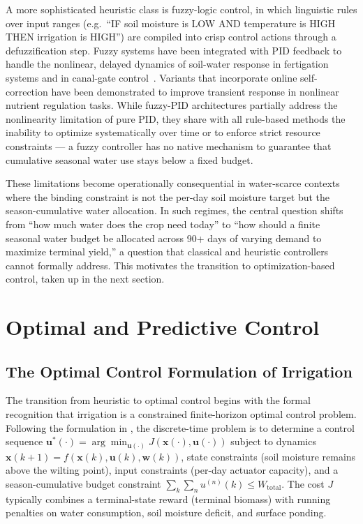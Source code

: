 A more sophisticated heuristic class is fuzzy-logic control, in which
linguistic rules over input ranges (e.g.\ ``IF soil moisture is LOW
AND temperature is HIGH THEN irrigation is HIGH'') are compiled into
crisp control actions through a defuzzification step. Fuzzy systems
have been integrated with PID feedback to handle the nonlinear,
delayed dynamics of soil-water response in fertigation systems and in
canal-gate control~\cite{Sharma2025,Mahmud2026}. Variants that
incorporate online self-correction have been demonstrated to improve
transient response in nonlinear nutrient regulation tasks. While
fuzzy-PID architectures partially address the nonlinearity limitation
of pure PID, they share with all rule-based methods the inability to
optimize systematically over time or to enforce strict resource
constraints --- a fuzzy controller has no native mechanism to
guarantee that cumulative seasonal water use stays below a fixed
budget.

These limitations become operationally consequential in water-scarce
contexts where the binding constraint is not the per-day soil
moisture target but the season-cumulative water allocation. In such
regimes, the central question shifts from ``how much water does the
crop need today'' to ``how should a finite seasonal water budget be
allocated across 90+ days of varying demand to maximize terminal
yield,'' a question that classical and heuristic controllers cannot
formally address. This motivates the transition to optimization-based
control, taken up in the next section.

\section{Optimal and Predictive Control}
\label{sec:lit-mpc}

\subsection{The Optimal Control Formulation of Irrigation}

The transition from heuristic to optimal control begins with the
formal recognition that irrigation is a constrained finite-horizon
optimal control problem. Following the formulation in
\cite{LopezJimenez2022,Lopezjimenez2024}, the discrete-time problem
is to determine a control sequence
$\mathbf{u}^*(\cdot) = \arg\min_{\mathbf{u}(\cdot)} J(\mathbf{x}(\cdot), \mathbf{u}(\cdot))$
subject to dynamics
$\mathbf{x}(k+1) = f(\mathbf{x}(k), \mathbf{u}(k), \mathbf{w}(k))$,
state constraints (soil moisture remains above the wilting point),
input constraints (per-day actuator capacity), and a season-cumulative
budget constraint
$\sum_k \sum_n u^{(n)}(k) \leq W_{\mathrm{total}}$.
The cost $J$ typically combines a terminal-state reward (terminal
biomass) with running penalties on water consumption, soil moisture
deficit, and surface ponding.

